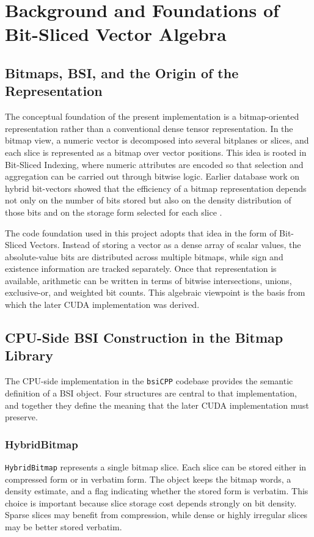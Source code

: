 \chapter{Background and Foundations of Bit-Sliced Vector Algebra}

\section{Bitmaps, BSI, and the Origin of the Representation}
The conceptual foundation of the present implementation is a bitmap-oriented representation rather than a conventional dense tensor representation. In the bitmap view, a numeric vector is decomposed into several bitplanes or slices, and each slice is represented as a bitmap over vector positions. This idea is rooted in Bit-Sliced Indexing, where numeric attributes are encoded so that selection and aggregation can be carried out through bitwise logic. Earlier database work on hybrid bit-vectors showed that the efficiency of a bitmap representation depends not only on the number of bits stored but also on the density distribution of those bits and on the storage form selected for each slice \cite{hybridbitmap}.

The code foundation used in this project adopts that idea in the form of Bit-Sliced Vectors. Instead of storing a vector as a dense array of scalar values, the absolute-value bits are distributed across multiple bitmaps, while sign and existence information are tracked separately. Once that representation is available, arithmetic can be written in terms of bitwise intersections, unions, exclusive-or, and weighted bit counts. This algebraic viewpoint is the basis from which the later CUDA implementation was derived.

\section{CPU-Side BSI Construction in the Bitmap Library}
The CPU-side implementation in the \texttt{bsiCPP} codebase provides the semantic definition of a BSI object. Four structures are central to that implementation, and together they define the meaning that the later CUDA implementation must preserve.

\subsection{HybridBitmap}
\texttt{HybridBitmap} represents a single bitmap slice. Each slice can be stored either in compressed form or in verbatim form. The object keeps the bitmap words, a density estimate, and a flag indicating whether the stored form is verbatim. This choice is important because slice storage cost depends strongly on bit density. Sparse slices may benefit from compression, while dense or highly irregular slices may be better stored verbatim.


